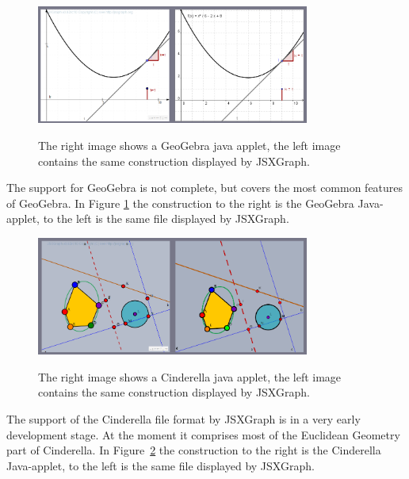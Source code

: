 \documentclass[12pt,a4paper]{article}%
\begin{document}
\begin{figure}[ht]
\begin{center}
\includegraphics[width=0.8\textwidth]{geogebra.png}\\
\caption{The right image shows a GeoGebra java applet, 
the left image contains the same construction displayed 
by JSXGraph.}\label{fig:geogebra}
\end{center}
\end{figure}
The support for GeoGebra is not complete, but covers the most common features of  GeoGebra. In Figure \ref{fig:geogebra} the construction to the right is the GeoGebra Java-applet, to the left is the same file displayed by JSXGraph.


\begin{figure}[ht]
\begin{center}
\includegraphics[width=0.8\textwidth]{cindy.png}\\
\caption{The right image shows a Cinderella java applet, 
the left image contains the same construction displayed 
by JSXGraph.}\label{fig:cindy}
\end{center}
\end{figure}
The support of the Cinderella file format \cite{kortenkamp1999} by JSXGraph is in a very early development stage. At the moment it comprises most of the Euclidean Geometry part of Cinderella. In Figure~\ref{fig:cindy} the construction to the right is the Cinderella Java-applet, to the left is the same file displayed by JSXGraph.
\end{document}
